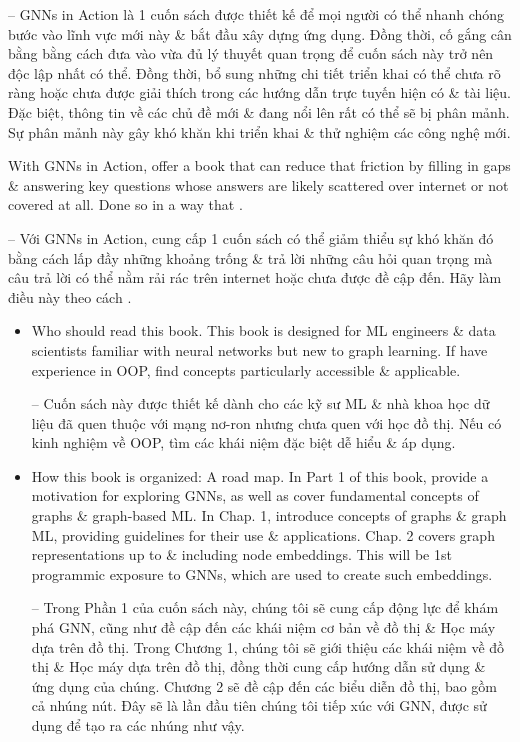 \documentclass{article}
\begin{document}
\begin{itemize}
    -- GNNs in Action là 1 cuốn sách được thiết kế để mọi người có thể nhanh chóng bước vào lĩnh vực mới này \& bắt đầu xây dựng ứng dụng. Đồng thời, cố gắng cân bằng bằng cách đưa vào vừa đủ lý thuyết quan trọng để cuốn sách này trở nên độc lập nhất có thể. Đồng thời, bổ sung những chi tiết triển khai có thể chưa rõ ràng hoặc chưa được giải thích trong các hướng dẫn trực tuyến hiện có \& tài liệu. Đặc biệt, thông tin về các chủ đề mới \& đang nổi lên rất có thể sẽ bị phân mảnh. Sự phân mảnh này gây khó khăn khi triển khai \& thử nghiệm các công nghệ mới.

    With GNNs in Action, offer a book that can reduce that friction by filling in gaps \& answering key questions whose answers are likely scattered over internet or not covered at all. Done so in a way that .

    -- Với GNNs in Action, cung cấp 1 cuốn sách có thể giảm thiểu sự khó khăn đó bằng cách lấp đầy những khoảng trống \& trả lời những câu hỏi quan trọng mà câu trả lời có thể nằm rải rác trên internet hoặc chưa được đề cập đến. Hãy làm điều này theo cách .
    \begin{itemize}
        \item {\sf Who should read this book.} This book is designed for ML engineers \& data scientists familiar with neural networks but new to graph learning. If have experience in OOP, find concepts particularly accessible \& applicable.

        -- Cuốn sách này được thiết kế dành cho các kỹ sư ML \& nhà khoa học dữ liệu đã quen thuộc với mạng nơ-ron nhưng chưa quen với học đồ thị. Nếu có kinh nghiệm về OOP, tìm các khái niệm đặc biệt dễ hiểu \& áp dụng.
        \item {\sf How this book is organized: A road map.} In Part 1 of this book, provide a motivation for exploring GNNs, as well as cover fundamental concepts of graphs \& graph-based ML. In Chap. 1, introduce concepts of graphs \& graph ML, providing guidelines for their use \& applications. Chap. 2 covers graph representations up to \& including node embeddings. This will be 1st programmic exposure to GNNs, which are used to create such embeddings.

        -- Trong Phần 1 của cuốn sách này, chúng tôi sẽ cung cấp động lực để khám phá GNN, cũng như đề cập đến các khái niệm cơ bản về đồ thị \& Học máy dựa trên đồ thị. Trong Chương 1, chúng tôi sẽ giới thiệu các khái niệm về đồ thị \& Học máy dựa trên đồ thị, đồng thời cung cấp hướng dẫn sử dụng \& ứng dụng của chúng. Chương 2 sẽ đề cập đến các biểu diễn đồ thị, bao gồm cả nhúng nút. Đây sẽ là lần đầu tiên chúng tôi tiếp xúc với GNN, được sử dụng để tạo ra các nhúng như vậy.


\end{itemize}
\end{itemize}
\end{document}
